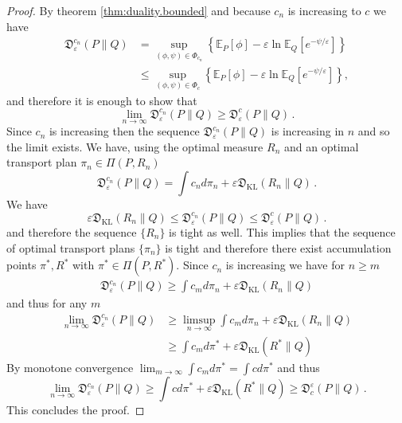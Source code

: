 \documentclass{amsart}
\theoremstyle{definition}
\theoremstyle{remark}
\numberwithin{equation}{section}
\begin{document}
\begin{proof}
By theorem \ref{thm:duality.bounded}
and because $c_n$ is increasing to $c$ we have 
\begin{equation}
\begin{aligned}
\mathfrak{D}^{c_n}_\varepsilon(P\|Q)&=
\sup_{(\phi,\psi)\in \Phi_{c_n}} \left\{ \mathbb{E}_P[\phi] - \varepsilon\ln \mathbb{E}_Q[e^{-\psi/\varepsilon}] \right\}
\\
&\le \sup_{(\phi,\psi)\in \Phi_{c}} \left\{ \mathbb{E}_P[\phi] - \varepsilon\ln \mathbb{E}_Q[e^{-\psi/\varepsilon}] \right\},
\end{aligned}
\end{equation}
and therefore it is enough to show that 
\begin{equation}
\lim_{n \to \infty}\mathfrak{D}^{c_n}_\varepsilon(P\|Q)\ge \mathfrak{D}^{c}_\varepsilon(P\|Q) \,.
\end{equation}
Since $c_n$ is increasing then the sequence $\mathfrak{D}^{c_n}_\varepsilon(P\|Q)$ is increasing in $n$ and so the limit exists.  We have, using the optimal measure $R_n$ and an optimal transport plan $\pi_n \in \Pi(P,R_n)$  
\begin{equation}
\mathfrak{D}^{c_n}_\varepsilon(P\|Q) = \int c_n d\pi_n + \varepsilon \mathfrak{D}_{\textrm{KL}}(R_n \|Q)\,.
\end{equation}
We have 
\begin{equation}
\varepsilon \mathfrak{D}_{\textrm{KL}}(R_n \|Q) \le \mathfrak{D}^{c_n}_\varepsilon(P\|Q)  \le \mathfrak{D}^{c}_\varepsilon(P\|Q) \,.
\end{equation}
and therefore the sequence $\{R_n\}$ is tight as well.  This implies that the sequence of optimal transport plans $\{\pi_n\}$ is tight and therefore 
there exist accumulation points $\pi^*,R^*$ with $\pi^* \in \Pi(P,R^*)$.  Since $c_n$
is increasing we have for $n\ge m  $
\begin{equation}
\begin{aligned}
\mathfrak{D}^{c_n}_\varepsilon(P\|Q) \ge \int c_m d\pi_n + \varepsilon \mathfrak{D}_{\textrm{KL}}(R_n \|Q)
\end{aligned}
\end{equation}
and thus for any $m$
\begin{equation}
\begin{aligned}
\lim_{n \to \infty} \mathfrak{D}^{c_n}_\varepsilon(P\|Q) &\ge \limsup_{n \to \infty} \int c_m d\pi_n + \varepsilon \mathfrak{D}_{\textrm{KL}}(R_n \|Q) \\
&\ge \int c_m d\pi^* + \varepsilon \mathfrak{D}_{\textrm{KL}}(R^* \|Q)
\end{aligned}
\end{equation}
By monotone convergence $\lim_{m\to \infty}\int c_m d\pi^* = \int c d\pi^*$ and thus 
\begin{equation}
\lim_{n \to \infty} \mathfrak{D}^{c_n}_\varepsilon(P\|Q) \ge \int c d\pi^* +  \varepsilon \mathfrak{D}_{\textrm{KL}}(R^* \|Q) \ge \mathfrak{D}^{\varepsilon}_c(P\|Q)\,.
\end{equation}
This concludes the proof.

\end{proof}
\end{document}
